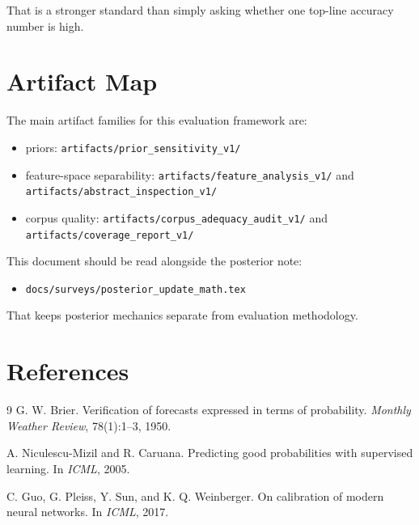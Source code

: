 \documentclass[11pt]{article}
\begin{document}
That is a stronger standard than simply asking whether one top-line accuracy
number is high.

\section{Artifact Map}

The main artifact families for this evaluation framework are:
\begin{itemize}[leftmargin=1.5em]
    \item priors:
    \texttt{artifacts/prior\_sensitivity\_v1/}
    \item feature-space separability:
    \texttt{artifacts/feature\_analysis\_v1/} and
    \texttt{artifacts/abstract\_inspection\_v1/}
    \item corpus quality:
    \texttt{artifacts/corpus\_adequacy\_audit\_v1/} and
    \texttt{artifacts/coverage\_report\_v1/}
\end{itemize}

This document should be read alongside the posterior note:
\begin{itemize}[leftmargin=1.5em]
    \item \texttt{docs/surveys/posterior\_update\_math.tex}
\end{itemize}

That keeps posterior mechanics separate from evaluation methodology.

\section{References}
\begin{thebibliography}{9}
G. W. Brier.
\newblock Verification of forecasts expressed in terms of probability.
\newblock \emph{Monthly Weather Review}, 78(1):1--3, 1950.

A. Niculescu-Mizil and R. Caruana.
\newblock Predicting good probabilities with supervised learning.
\newblock In \emph{ICML}, 2005.

C. Guo, G. Pleiss, Y. Sun, and K. Q. Weinberger.
\newblock On calibration of modern neural networks.
\newblock In \emph{ICML}, 2017.
\end{thebibliography}
\end{document}
